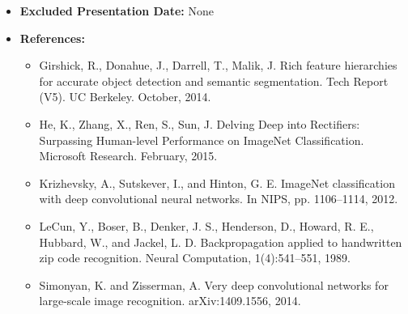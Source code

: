 \documentclass[10pt,a4]{article}
\begin{document}
\begin{itemize}
	\item \textbf{Excluded Presentation Date:} None
	
	\item \textbf{References:}
	\begin{itemize}
		\item Girshick, R., Donahue, J., Darrell, T., Malik, J. Rich feature hierarchies for accurate object detection and semantic segmentation. Tech Report (V5). UC Berkeley. October, 2014.
		\item He, K., Zhang, X., Ren, S., Sun, J. Delving Deep into Rectifiers: Surpassing Human-level Performance on ImageNet Classification. Microsoft Research. February, 2015.
		\item Krizhevsky, A., Sutskever, I., and Hinton, G. E. ImageNet classification with deep convolutional neural networks. In NIPS, pp. 1106–1114, 2012.
		\item LeCun, Y., Boser, B., Denker, J. S., Henderson, D., Howard, R. E., Hubbard, W., and Jackel, L. D. Backpropagation applied to handwritten zip code recognition. Neural Computation, 1(4):541–551, 1989.
		\item 
		Simonyan, K. and Zisserman, A. Very deep convolutional networks for large-scale image recognition. arXiv:1409.1556, 2014.
		
	\end{itemize}
\end{itemize}
\end{document}
